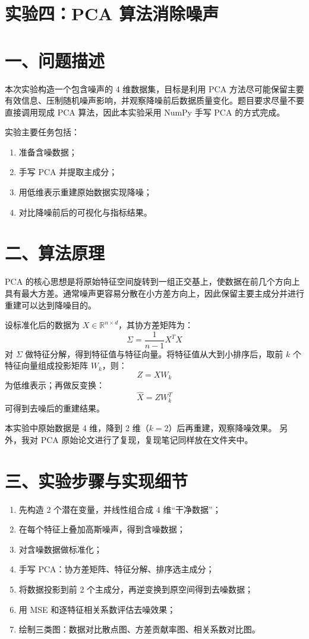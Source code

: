 \documentclass[12pt,a4paper]{ctexart}
\begin{document}
\section*{实验四：PCA 算法消除噪声}

\section*{一、问题描述}
本次实验构造一个包含噪声的 4 维数据集，目标是利用 PCA 方法尽可能保留主要有效信息、压制随机噪声影响，并观察降噪前后数据质量变化。题目要求尽量不要直接调用现成 PCA 算法，因此本实验采用 NumPy 手写 PCA 的方式完成。

实验主要任务包括：
\begin{enumerate}
	\item 准备含噪数据；
	\item 手写 PCA 并提取主成分；
	\item 用低维表示重建原始数据实现降噪；
	\item 对比降噪前后的可视化与指标结果。
\end{enumerate}

\section*{二、算法原理}
PCA 的核心思想是将原始特征空间旋转到一组正交基上，使数据在前几个方向上具有最大方差。通常噪声更容易分散在小方差方向上，因此保留主要主成分并进行重建可以达到降噪目的。

设标准化后的数据为 $X\in\mathbb{R}^{n\times d}$，其协方差矩阵为：
\[
\Sigma = \frac{1}{n-1}X^TX
\]
对 $\Sigma$ 做特征分解，得到特征值与特征向量。将特征值从大到小排序后，取前 $k$ 个特征向量组成投影矩阵 $W_k$，则：
\[
Z = XW_k
\]
为低维表示；再做反变换：
\[
\hat{X} = ZW_k^T
\]
可得到去噪后的重建结果。

本实验中原始数据是 4 维，降到 2 维（$k=2$）后再重建，观察降噪效果。
另外，我对 PCA 原始论文进行了复现，复现笔记同样放在文件夹中。

\section*{三、实验步骤与实现细节}
\begin{enumerate}
	\item 先构造 2 个潜在变量，并线性组合成 4 维“干净数据”；
	\item 在每个特征上叠加高斯噪声，得到含噪数据；
	\item 对含噪数据做标准化；
	\item 手写 PCA：协方差矩阵、特征分解、排序选主成分；
	\item 将数据投影到前 2 个主成分，再逆变换到原空间得到去噪数据；
	\item 用 MSE 和逐特征相关系数评估去噪效果；
	\item 绘制三类图：数据对比散点图、方差贡献率图、相关系数对比图。
\end{enumerate}
\end{document}
